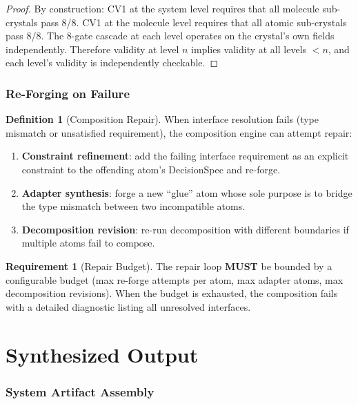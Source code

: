 \documentclass[11pt,a4paper,twoside]{article}
\theoremstyle{definition}
\newtheorem{definition}{Definition}[section]
\newtheorem{requirement}{Requirement}[section]
\theoremstyle{plain}
\theoremstyle{remark}
\begin{document}
\begin{proof}
By construction: CV1 at the system level requires that all molecule
sub-crystals pass 8/8. CV1 at the molecule level requires that all
atomic sub-crystals pass 8/8. The 8-gate cascade at each level
operates on the crystal's own fields independently. Therefore
validity at level $n$ implies validity at all levels $< n$, and
each level's validity is independently checkable.
\end{proof}


\section{Re-Forging on Failure}\label{sec:reforge}

\begin{definition}[Composition Repair]\label{def:repair}
When interface resolution fails (type mismatch or unsatisfied
requirement), the composition engine can attempt repair:
\begin{enumerate}[nosep,label=(\roman*)]
  \item \textbf{Constraint refinement}: add the failing interface
        requirement as an explicit constraint to the offending atom's
        DecisionSpec and re-forge.
  \item \textbf{Adapter synthesis}: forge a new ``glue'' atom whose
        sole purpose is to bridge the type mismatch between two
        incompatible atoms.
  \item \textbf{Decomposition revision}: re-run decomposition with
        different boundaries if multiple atoms fail to compose.
\end{enumerate}
\end{definition}

\begin{requirement}[Repair Budget]\label{req:repairbudget}
The repair loop \textbf{MUST} be bounded by a configurable budget
(max re-forge attempts per atom, max adapter atoms, max decomposition
revisions). When the budget is exhausted, the composition fails with
a detailed diagnostic listing all unresolved interfaces.
\end{requirement}


\part{Synthesized Output}\label{part:output}

\section{System Artifact Assembly}\label{sec:assembly}
\end{document}
